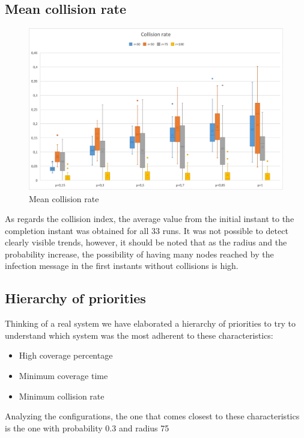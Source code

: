 \subsection{Mean collision rate}

\begin{figure}
\centering
    \includegraphics[width= 1\textwidth]{./images/Collision200Boxplot.png}
    \caption{Mean collision rate}
    \label{fig:immagine}
\end{figure}

\noindent As regards the collision index, the average value from the initial instant to the completion instant was obtained for all 33 runs. It was not possible to detect clearly visible trends, however, it should be noted that as the radius and the probability increase, the possibility of having many nodes reached by the infection message in the first instants without collisions is high.

\clearpage 

\subsection{Hierarchy of priorities}
Thinking of a real system we have elaborated a hierarchy of priorities to try to understand which system was the most adherent to these characteristics:
\begin{itemize}
\item High coverage percentage
\item Minimum coverage time
\item Minimum collision rate
\end{itemize}

Analyzing the configurations, the one that comes closest to these characteristics is the one with probability 0.3 and radius 75

